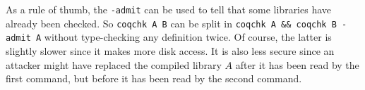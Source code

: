 As a rule of thumb, the {\tt -admit} can be used to tell that some
libraries have already been checked. So {\tt coqchk A B} can be split
in {\tt coqchk A \&\& coqchk B -admit A} without type-checking any
definition twice. Of course, the latter is slightly slower since it
makes more disk access. It is also less secure since an attacker might
have replaced the compiled library $A$ after it has been read by the
first command, but before it has been read by the second command.

